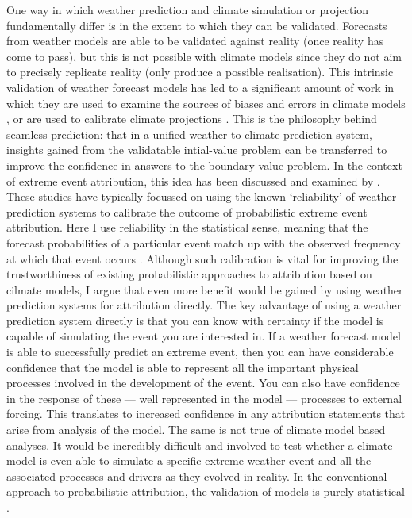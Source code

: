     One way in which weather prediction and climate simulation or projection fundamentally differ is in the extent to which they can be validated. Forecasts from weather models are able to be validated against reality (once reality has come to pass), but this is not possible with climate models since they do not aim to precisely replicate reality (only produce a possible realisation). This intrinsic validation of weather forecast models has led to a significant amount of work in which they are used to examine the sources of biases and errors in climate models \citep{williams_transpose-amip_2013}, or are used to calibrate climate projections \citep{palmer_toward_2008,matsueda_calibrating_2016}. This is the philosophy behind seamless prediction: that in a unified weather to climate prediction system, insights gained from the validatable intial-value problem can be transferred to improve the confidence in answers to the boundary-value problem. In the context of extreme event attribution, this idea has been discussed and examined by \citet{weisheimer_atmospheric_2017,palmer_simple_2018,lott_evaluating_2016,bellprat_attribution_2016,bellprat_towards_2019}. These studies have typically focussed on using the known `reliability' of weather prediction systems to calibrate the outcome of probabilistic extreme event attribution. Here I use reliability in the statistical sense, meaning that the forecast probabilities of a particular event match up with the observed frequency at which that event occurs \citep{weisheimer_reliability_2014}. Although such calibration is vital for improving the trustworthiness of existing probabilistic approaches to attribution based on cilmate models, I argue that even more benefit would be gained by using weather prediction systems for attribution directly. The key advantage of using a weather prediction system directly is that you can know with certainty if the model is capable of simulating the event you are interested in. If a weather forecast model is able to successfully predict an extreme event, then you can have considerable confidence that the model is able to represent all the important physical processes involved in the development of the event. You can also have confidence in the response of these --- well represented in the model --- processes to external forcing. This translates to increased confidence in any attribution statements that arise from analysis of the model. The same is not true of climate model based analyses. It would be incredibly difficult and involved to test whether a climate model is even able to simulate a specific extreme weather event and all the associated processes and drivers as they evolved in reality. In the conventional approach to probabilistic attribution, the validation of models is purely statistical \citep{philip_protocol_2020}.

